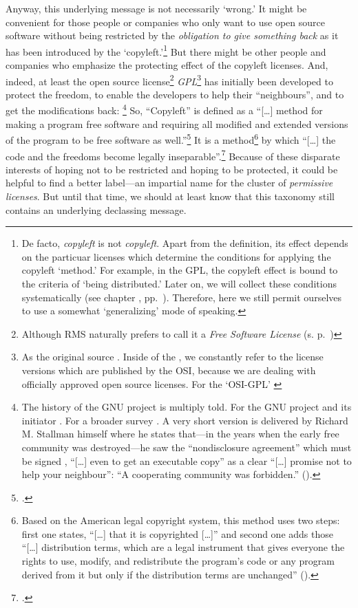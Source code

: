 Anyway, this underlying message is not necessarily `wrong.' It might be
convenient for those people or companies who only want to use open source
software without being restricted by the \emph{obligation to give something
back} as it has been introduced by the `copyleft.'\footnote{De facto,
\emph{copyleft} is not \emph{copyleft}. Apart from the definition, its effect
depends on the par\-ti\-cu\-ar licenses which determine the conditions for
applying the copyleft `method.' For example, in the GPL, the copyleft effect is
bound to the criteria of `being distributed.' Later on, we will collect these
conditions systematically (see chapter \emph{}, pp.\
\pageref{sec:OSUCdeduction}). Therefore, here we still permit ourselves to use a
somewhat `generalizing' mode of speaking.} But there might be other people and
companies who emphasize the protecting effect of the copyleft licenses. And,
indeed, at least the open source license\footnote{Although RMS naturally prefers
to call it a \emph{Free Software License} (s. p.\ \pageref{RmsFsPriority})
} \emph{GPL}\footnote{As the original source \cite[cf.][\nopage
wp]{Gpl20FsfLicense1991a}. Inside of the \oslic, we constantly refer to the
license versions which are published by the OSI, because we are dealing with
officially approved open source licenses. For the `OSI-GPL' \cite[cf.][\nopage
wp]{Gpl20OsiLicense1991a}} has initially been developed to protect the freedom,
to enable the developers to help their \enquote{neighbours}, and to get the
modifications back:%
  \footnote{The history of the GNU project is multiply told. For
  the GNU project and its initiator \cite[cf.\ pars pro toto][\nopage
  passim]{Williams2002a}. For a broader survey \cite[cf.\ pars pro toto][\nopage
  passim]{Moody2001a}. A very short version is delivered by Richard M. Stallman
  himself where he states that---in the years when the early free community was
  destroyed---he saw the \enquote{nondisclosure agreement} which must be signed ,
  \enquote{[\ldots] even to get an executable copy} as a clear \enquote{[\ldots]
  promise not to help your neighbour}: \enquote{A cooperating community was
  forbidden.} (\cite[cf.][16]{Stallman1999a}).}
So, \enquote{Copyleft} is defined
as a \enquote{[\ldots] method for making a program free software and requiring
all modified and extended versions of the program to be free software as
well.}\footcite[cf.][89]{Stallman1996c} It is a method\footnote{Based on the
American legal copyright system, this method uses two steps: first one states,
\enquote{[\ldots] that it is copyrighted [\ldots]} and second one adds those
\enquote{[\ldots] distribution terms, which are a legal instrument that gives
everyone the rights to use, modify, and redistribute the program's code or any
program derived from it but only if the distribution terms are unchanged}
(\cite[cf.][89]{Stallman1996c}).} by which \enquote{[\ldots] the code and the
freedoms become legally inseparable}.\footcite[cf.][89]{Stallman1996c} Because
of these disparate interests of hoping not to be restricted and hoping to be
protected, it could be helpful to find a better label---an impartial name for
the cluster of \emph{permissive licenses}. But until that time, we should at
least know that this taxonomy still contains an underlying declassing message.

